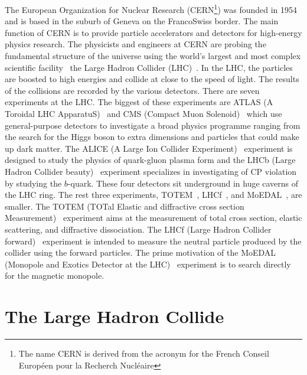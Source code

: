 The European Organization for Nuclear Research (CERN\footnote{The name CERN is derived from the acronym for the French Conseil Europ\'{e}en pour la Recherch Nucl\'{e}aire}) was founded in 1954 and is based in the suburb of Geneva on the Franco\textendash Swiss border.
The main function of CERN is to provide particle accelerators and detectors for high-energy physics research.
The physicists and engineers at CERN are probing the fundamental structure of the universe using the world's largest and most complex scientific facility \textemdash \ the Large Hadron Collider (LHC)~\cite{1748-0221-3-08-S08001}.
In the LHC, the particles are boosted to high energies and collide at close to the speed of light.
The results of the collisions are recorded by the various detectors.
There are seven experiments at the LHC.
The biggest of these experiments are ATLAS (A Toroidal LHC ApparatuS)~\cite{1748-0221-3-08-S08003} and CMS (Compact Muon Solenoid)~\cite{1748-0221-3-08-S08004} which use general-purpose detectors to investigate a broad physics programme ranging from the search for the Higgs boson to extra dimensions and particles that could make up dark matter.
The ALICE (A Large Ion Collider Experiment)~\cite{1748-0221-3-08-S08002} experiment is designed to study the physics of quark-gluon plasma form and the LHCb (Large Hadron Collider beauty)~\cite{1748-0221-3-08-S08005} experiment specializes in investigating of CP violation by studying the $b$-quark.
These four detectors sit underground in huge caverns of the LHC ring.
The rest three experiments, TOTEM~\cite{1748-0221-3-08-S08007}, LHCf~\cite{1748-0221-3-08-S08006}, and MoEDAL~\cite{Pinfold:1181486}, are smaller.
The TOTEM (TOTal Elastic and diffractive cross section Measurement)~\cite{1748-0221-3-08-S08007} experiment aims at the measurement of total cross section, elastic scattering, and diffractive dissociation.
The LHCf (Large Hadron Collider forward)~\cite{1748-0221-3-08-S08006} experiment is intended to measure the neutral particle produced by the collider using the forward particles.
The prime motivation of the MoEDAL (Monopole and Exotics Detector at the LHC)~\cite{Pinfold:1181486} experiment is to search directly for the magnetic monopole.

\section{The Large Hadron Collide}

